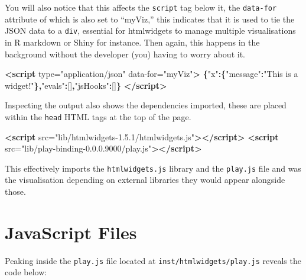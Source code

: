 \documentclass[
]{krantz}
\makeatletter
\newenvironment{Shaded}{\begin{snugshade}}{\end{snugshade}}
\newcommand{\KeywordTok}[1]{\textcolor[rgb]{0.27,0.27,0.27}{\textbf{#1}}}
\newcommand{\NormalTok}[1]{#1}
\newcommand{\OperatorTok}[1]{\textcolor[rgb]{0.43,0.43,0.43}{\textbf{#1}}}
\newcommand{\OtherTok}[1]{\textcolor[rgb]{0.37,0.37,0.37}{#1}}
\newcommand{\StringTok}[1]{\textcolor[rgb]{0.5,0.5,0.5}{#1}}
\newenvironment{kframe}{%
\medskip{}
\setlength{\fboxsep}{.8em}
 \def\at@end@of@kframe{}%
 \ifinner\ifhmode%
  \def\at@end@of@kframe{\end{minipage}}%
  \begin{minipage}{\columnwidth}%
 \fi\fi%
 \def\FrameCommand##1{\hskip\@totalleftmargin \hskip-\fboxsep
 \colorbox{shadecolor}{##1}\hskip-\fboxsep
     \hskip-\linewidth \hskip-\@totalleftmargin \hskip\columnwidth}%
 \MakeFramed {\advance\hsize-\width
   \@totalleftmargin\z@ \linewidth\hsize
   \@setminipage}}%
 {\par\unskip\endMakeFramed%
 \at@end@of@kframe}
\renewenvironment{Shaded}{\begin{kframe}}{\end{kframe}}
\makeatother
\begin{document}
You will also notice that this affects the \texttt{script} tag below it, the \texttt{data-for} attribute of which is also set to ``myViz,'' this indicates that it is used to tie the JSON data to a \texttt{div}, essential for htmlwidgets to manage multiple visualisations in R markdown or Shiny for instance. Then again, this happens in the background without the developer (you) having to worry about it.

\begin{Shaded}
\begin{Highlighting}[]
\KeywordTok{<script}\OtherTok{ type=}\StringTok{"application/json"} 
\OtherTok{  data{-}for=}\StringTok{"myViz"}\KeywordTok{>}
  \OperatorTok{\{}\StringTok{"x"}\OperatorTok{:\{}\StringTok{"message"}\OperatorTok{:}\StringTok{"This is a widget!"}\OperatorTok{\},}\StringTok{"evals"}\OperatorTok{:}\NormalTok{[]}\OperatorTok{,}\StringTok{"jsHooks"}\OperatorTok{:}\NormalTok{[]}\OperatorTok{\}}
\KeywordTok{</script>}
\end{Highlighting}
\end{Shaded}

Inspecting the output also shows the dependencies imported, these are placed within the \texttt{head} HTML tags at the top of the page.

\begin{Shaded}
\begin{Highlighting}[]
\KeywordTok{<script}\OtherTok{ src=}\StringTok{"lib/htmlwidgets{-}1.5.1/htmlwidgets.js"}\KeywordTok{></script>}
\KeywordTok{<script}\OtherTok{ src=}\StringTok{"lib/play{-}binding{-}0.0.0.9000/play.js"}\KeywordTok{></script>}
\end{Highlighting}
\end{Shaded}

This effectively imports the \texttt{htmlwidgets.js} library and the \texttt{play.js} file and was the visualisation depending on external libraries they would appear alongside those.

\hypertarget{widgets-first-js-files}{%
\section{JavaScript Files}\label{widgets-first-js-files}}

Peaking inside the \texttt{play.js} file located at \texttt{inst/htmlwidgets/play.js} reveals the code below:
\end{document}
